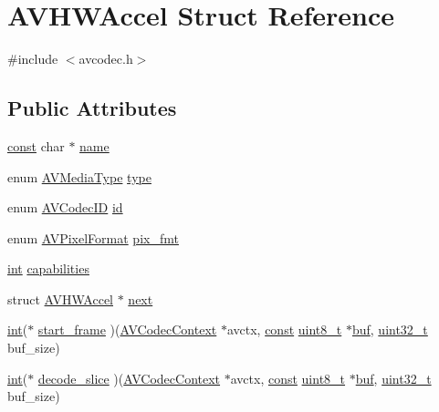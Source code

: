 \hypertarget{struct_a_v_h_w_accel}{}\section{A\+V\+H\+W\+Accel Struct Reference}
\label{struct_a_v_h_w_accel}


{\ttfamily \#include $<$avcodec.\+h$>$}

\subsection*{Public Attributes}
\begin{DoxyCompactItemize}
\item 
\hyperlink{getopt1_8c_a2c212835823e3c54a8ab6d95c652660e}{const} char $\ast$ \hyperlink{struct_a_v_h_w_accel_a9cc735be128cb62ff4cb594d3e3bdb92}{name}
\item 
enum \hyperlink{group__lavu__misc_ga9a84bba4713dfced21a1a56163be1f48}{A\+V\+Media\+Type} \hyperlink{struct_a_v_h_w_accel_af962ad3e15697454ba312d1254e5a423}{type}
\item 
enum \hyperlink{group__lavc__core_gaadca229ad2c20e060a14fec08a5cc7ce}{A\+V\+Codec\+ID} \hyperlink{struct_a_v_h_w_accel_a3c93d40193e9178eb7408295c6c2b2f2}{id}
\item 
enum \hyperlink{pixfmt_8h_a9a8e335cf3be472042bc9f0cf80cd4c5}{A\+V\+Pixel\+Format} \hyperlink{struct_a_v_h_w_accel_ac5692f044266af8c1c33b7ac549df338}{pix\+\_\+fmt}
\item 
\hyperlink{xmltok_8h_a5a0d4a5641ce434f1d23533f2b2e6653}{int} \hyperlink{struct_a_v_h_w_accel_aa1da71a1cc27b60294023a893759e60a}{capabilities}
\item 
struct \hyperlink{struct_a_v_h_w_accel}{A\+V\+H\+W\+Accel} $\ast$ \hyperlink{struct_a_v_h_w_accel_aaca69ddfacfa72b642007b5ab4b89424}{next}
\item 
\hyperlink{xmltok_8h_a5a0d4a5641ce434f1d23533f2b2e6653}{int}($\ast$ \hyperlink{struct_a_v_h_w_accel_a40b92f781dbaaecc9c82f636b790629b}{start\+\_\+frame} )(\hyperlink{struct_a_v_codec_context}{A\+V\+Codec\+Context} $\ast$avctx, \hyperlink{getopt1_8c_a2c212835823e3c54a8ab6d95c652660e}{const} \hyperlink{lib-src_2ffmpeg_2win32_2stdint_8h_a9a941819355e6f658991890ff66b4b0e}{uint8\+\_\+t} $\ast$\hyperlink{xlstr_8c_a781718f5b53a876fe91c424c4607fa8f}{buf}, \hyperlink{lib-src_2ffmpeg_2win32_2stdint_8h_a6eb1e68cc391dd753bc8ce896dbb8315}{uint32\+\_\+t} buf\+\_\+size)
\item 
\hyperlink{xmltok_8h_a5a0d4a5641ce434f1d23533f2b2e6653}{int}($\ast$ \hyperlink{struct_a_v_h_w_accel_ab1effeed94fc20e372a60fec7c4d741b}{decode\+\_\+slice} )(\hyperlink{struct_a_v_codec_context}{A\+V\+Codec\+Context} $\ast$avctx, \hyperlink{getopt1_8c_a2c212835823e3c54a8ab6d95c652660e}{const} \hyperlink{lib-src_2ffmpeg_2win32_2stdint_8h_a9a941819355e6f658991890ff66b4b0e}{uint8\+\_\+t} $\ast$\hyperlink{xlstr_8c_a781718f5b53a876fe91c424c4607fa8f}{buf}, \hyperlink{lib-src_2ffmpeg_2win32_2stdint_8h_a6eb1e68cc391dd753bc8ce896dbb8315}{uint32\+\_\+t} buf\+\_\+size)

\end{DoxyCompactItemize}
